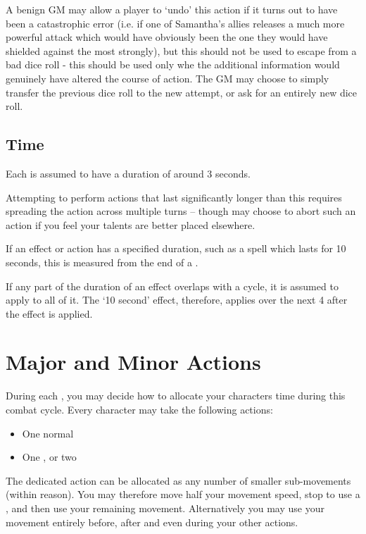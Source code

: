 A benign GM may allow a player to `undo' this action if it turns out to have been a catastrophic error (i.e. if one of Samantha's allies releases a much more powerful attack which would have obviously been the one they would have shielded against the most strongly), but this should not be used to escape from a bad dice roll - this should be used only whe the additional information would genuinely have altered the course of action. The GM may choose to simply transfer the previous dice roll to the new attempt, or ask for an entirely new dice roll. 


\subsection{Time}

Each  is assumed to have a duration of around 3 seconds. 

Attempting to perform actions that last significantly longer than this requires spreading the action across multiple turns -- though may choose to abort such an action if you feel your talents are better placed elsewhere. 

If an effect or action has a specified duration, such as a spell which lasts for 10 seconds, this is measured from the end of a .

If any part of the duration of an effect overlaps with a cycle, it is assumed to apply to all of it. The `10 second' effect, therefore, applies over the next 4  after the effect is applied. 


 \section{Major and Minor Actions} \label{S:CombatActions}
 
 During each , you may decide how to allocate your character\apos{}s time during this combat cycle. Every character may take the following actions: 
 
 \begin{itemize}
	\item One normal 
	\item One , or two 
 \end{itemize}
 
 The dedicated  action can be allocated as any number of smaller sub-movements (within reason). You may therefore move half your movement speed, stop to use a , and then use your remaining movement. Alternatively you may use your movement entirely before, after and even during your other actions.  
 
